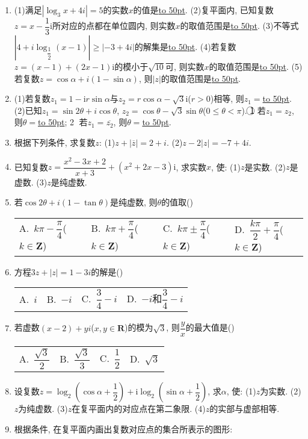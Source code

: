 \documentclass[10pt,a4paper]{article}
\newcommand{\blank}[1]{\underline{\hbox to #1pt{}}}
\newcommand{\fourch}[4]{\par\begin{tabular}{p{.23\textwidth}p{.23\textwidth}p{.23\textwidth}p{.23\textwidth}}
A.~#1 &B.~#2& C.~#3& D.~#4
\end{tabular}}
\begin{document}
\begin{enumerate}[1.]
\textcircled{1} 若$z\in \mathbf{R}$, 则$\theta =$\blank{50}; \textcircled{2} 若$z$是纯虚数, 则$\theta =$\blank{50}.
(3)已知复数$z=(\tan ^2\theta +\tan \theta -2)+\mathrm{i}(\cos ^2\theta -\sin ^2\theta)$.
\textcircled{1} 当$\theta =$\blank{50}时, $z$为实数; \textcircled{2} 当$\theta =$\blank{50}时, $z$为纯虚数; \textcircled{3} 当$\theta =$\blank{50}时, $z=0$.
(4)复平面内, 若复数$z=(m^2-m-2)+(m^2-3m+2)\mathrm{i}$所对应的点在虚轴上, 则实数$m$的值等于\blank{50}.
(5)复平面内, 若复数$(m^2-8m+15)+(m^2-5m-14)i$所对应的点位于第四象限, 则实数$m$的取值范围是\blank{50}.
\item (1)满足$|\log _3x+4i|=5$的实数$x$的值是\blank{50}.
(2)复平面内, 已知复数$z=x-\dfrac 13\mathrm{i}$所对应的点都在单位圆内, 则实数$x$的取值范围是\blank{50}.
(3)不等式$|4+i\log _{\dfrac 12}(x-1)|\ge|-3+4i|$的解集是\blank{50}.
(4)若复数$z=(x-1)+(2x-1)\mathrm{i}$的模小于$\sqrt {10}$可, 则实数$x$的取值范围是\blank{50}.
(5)若复数$z=\cos \alpha +i(1-\sin \alpha)$, 则$|z|$的取值范围是\blank{50}.
\item (1)若复数$z_1=1-\mathrm{i}r\sin \alpha$与$z_2=r\cos \alpha -\sqrt 3\mathrm{i}$($r>0$)相等, 则$z_1=$\blank{50}.
(2)已知$z_1=\sin 2\theta +i\cos \theta$, $z_2=\cos \theta -\sqrt 3\sin \theta$($0\le \theta <\pi$).
\textcircled{1} 若$z_1=z_2$, 则$\theta =$\blank{50}; \textcircled{2} 若$z_1=\overline{z_2}$, 则$\theta =$\blank{50}.
\item 根据下列条件, 求复数$z$:
(1)$z+|\overline z|=2+i$.
(2)$z-2|z|=-7+4i$.
\item 已知复数$z=\dfrac{{x^2}-3x+2}{x+3}+(x^2+2x-3)\mathrm{i}$, 求实数$x$, 使:
(1)$z$是实数.					(2)$z$是虚数.				(3)$z$是纯虚数.
\item 若$\cos 2\theta +i(1-\tan \theta)$是纯虚数, 则$\theta$的值取()
\fourch{$k\pi -\dfrac{\pi }4$($k\in \mathbf{Z}$)}{$k\pi +\dfrac{\pi }4$($k\in \mathbf{Z}$)}{$k\pi \pm \dfrac{\pi }4$($k\in \mathbf{Z}$)}{$\dfrac{k\pi }2+\dfrac{\pi }4$($k\in \mathbf{Z}$)}
\item 方程$3z+|z|=1-3i$的解是()
\fourch{$i$}{$-i$}{$\dfrac 34-i$}{$-i$和$\dfrac 34-i$}
\item 若虚数$(x-2)+yi$($x,y\in \mathbf{R}$)的模为$\sqrt 3$, 则$\dfrac yx$的最大值是()
\fourch{$\dfrac{\sqrt 3}2$}{$\dfrac{\sqrt 3}3$}{$\dfrac 12$}{$\sqrt 3$}
\item 设复数$z=\log _2(\cos \alpha +\dfrac 12)+\mathrm{i}\log _2(\sin \alpha +\dfrac 12)$, 求$\alpha$, 使:
(1)$z$为实数.	(2)$z$为纯虚数.		(3)$z$在复平面内的对应点在第二象限.
(4)$z$的实部与虚部相等.
\item 根据条件, 在复平面内画出复数对应点的集合所表示的图形:

\end{enumerate}
\end{document}
